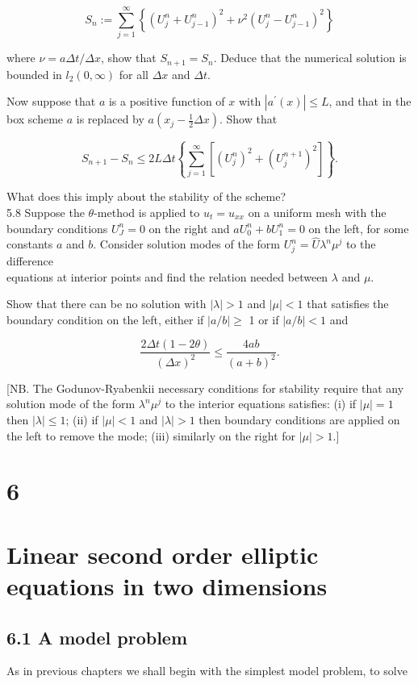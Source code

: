 \documentclass[10pt]{article}
\begin{document}
\[
S_{n}:=\sum_{j=1}^{\infty}\left\{\left(U_{j}^{n}+U_{j-1}^{n}\right)^{2}+\nu^{2}\left(U_{j}^{n}-U_{j-1}^{n}\right)^{2}\right\}
\]

where \(\nu=a \Delta t / \Delta x\), show that \(S_{n+1}=S_{n}\). Deduce that the numerical solution is bounded in \(l_{2}(0, \infty)\) for all \(\Delta x\) and \(\Delta t\).

Now suppose that \(a\) is a positive function of \(x\) with \(\left|a^{\prime}(x)\right| \leq L\), and that in the box scheme \(a\) is replaced by \(a\left(x_{j}-\frac{1}{2} \Delta x\right)\). Show that

\[
S_{n+1}-S_{n} \leq 2 L \Delta t\left\{\sum_{j=1}^{\infty}\left[\left(U_{j}^{n}\right)^{2}+\left(U_{j}^{n+1}\right)^{2}\right]\right\} .
\]

What does this imply about the stability of the scheme?\\
5.8 Suppose the \(\theta\)-method is applied to \(u_{t}=u_{x x}\) on a uniform mesh with the boundary conditions \(U_{J}^{n}=0\) on the right and \(a U_{0}^{n}+b U_{1}^{n}=0\) on the left, for some constants \(a\) and \(b\). Consider solution modes of the form \(U_{j}^{n}=\widehat{U} \lambda^{n} \mu^{j}\) to the difference\\
equations at interior points and find the relation needed between \(\lambda\) and \(\mu\).

Show that there can be no solution with \(|\lambda|>1\) and \(|\mu|<1\) that satisfies the boundary condition on the left, either if \(|a / b| \geq\) 1 or if \(|a / b|<1\) and

\[
\frac{2 \Delta t(1-2 \theta)}{(\Delta x)^{2}} \leq \frac{4 a b}{(a+b)^{2}} .
\]

[NB. The Godunov-Ryabenkii necessary conditions for stability require that any solution mode of the form \(\lambda^{n} \mu^{j}\) to the interior equations satisfies: (i) if \(|\mu|=1\) then \(|\lambda| \leq 1\); (ii) if \(|\mu|<1\) and \(|\lambda|>1\) then boundary conditions are applied on the left to remove the mode; (iii) similarly on the right for \(|\mu|>1\).]

\section*{6}
\section*{Linear second order elliptic equations in two dimensions}
\subsection*{6.1 A model problem}
As in previous chapters we shall begin with the simplest model problem, to solve
\end{document}
